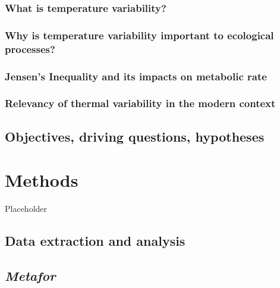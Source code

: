 \documentclass[12pt,twoside]{reedthesis}
\begin{document}
\hypertarget{what-is-temperature-variability}{%
\subsection{What is temperature variability?}\label{what-is-temperature-variability}}

\hypertarget{why-is-temperature-variability-important-to-ecological-processes}{%
\subsection{Why is temperature variability important to ecological processes?}\label{why-is-temperature-variability-important-to-ecological-processes}}

\hypertarget{jensens-inequality-and-its-impacts-on-metabolic-rate}{%
\subsection{Jensen's Inequality and its impacts on metabolic rate}\label{jensens-inequality-and-its-impacts-on-metabolic-rate}}

\hypertarget{relevancy-of-thermal-variability-in-the-modern-context}{%
\subsection{Relevancy of thermal variability in the modern context}\label{relevancy-of-thermal-variability-in-the-modern-context}}

\hypertarget{objectives-driving-questions-hypotheses}{%
\section{Objectives, driving questions, hypotheses}\label{objectives-driving-questions-hypotheses}}

\hypertarget{methods}{%
\chapter{Methods}\label{methods}}

Placeholder

\hypertarget{data-extraction-and-analysis}{%
\section{Data extraction and analysis}\label{data-extraction-and-analysis}}

\hypertarget{metafor}{%
\section{\texorpdfstring{\emph{Metafor}}{Metafor}}\label{metafor}}
\end{document}
